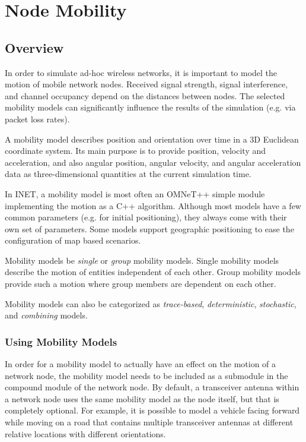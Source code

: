 \chapter{Node Mobility}
\label{cha:mobility}

\section{Overview}
\label{sec:mobility:overview}

In order to simulate ad-hoc wireless networks, it is important to model the
motion of mobile network nodes. Received signal strength, signal
interference, and channel occupancy depend on the distances between nodes.
The selected mobility models can significantly influence the results of the
simulation (e.g. via packet loss rates).

A mobility model describes position and orientation over time in a 3D
Euclidean coordinate system. Its main purpose is to provide position,
velocity and acceleration, and also angular position, angular velocity,
and angular acceleration data as three-dimensional quantities at the
current simulation time.

In INET, a mobility model is most often an OMNeT++ simple module
implementing the motion as a C++ algorithm. Although most models have a few
common parameters (e.g. for initial positioning), they always come with
their own set of parameters. Some models support geographic positioning to
ease the configuration of map based scenarios.

Mobility models be \textit{single} or \textit{group} mobility models.
Single mobility models describe the motion of entities independent of each other.
Group mobility models provide such a motion where group members are dependent
on each other.

Mobility models can also be categorized as \textit{trace-based},
\textit{deterministic}, \textit{stochastic}, and \textit{combining} models.

\subsection*{Using Mobility Models}

In order for a mobility model to actually have an effect on the motion of a network node,
the mobility model needs to be included as a submodule in the compound module of the
network node. By default, a transceiver antenna within a network node uses
the same mobility model as the node itself, but that is completely optional.
For example, it is possible to model a vehicle facing forward while moving
on a road that contains multiple transceiver antennas at different relative
locations with different orientations.

